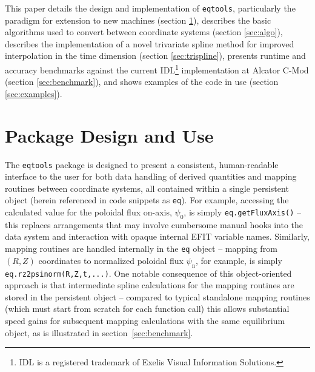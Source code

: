 \documentclass{elsarticle}
\newcommand{\eqtools}{\texttt{eqtools}\xspace}
\begin{document}
This paper details the design and implementation of \eqtools, particularly the paradigm for extension to new machines (section \ref{sec:design}), describes the basic algorithms used to convert between coordinate systems (section \ref{sec:algo}), describes the implementation of a novel trivariate spline method for improved interpolation in the time dimension (section \ref{sec:trispline}), presents runtime and accuracy benchmarks against the current IDL\footnote{IDL is a registered trademark of Exelis Visual Information Solutions.} implementation at Alcator C-Mod (section \ref{sec:benchmark}), and shows examples of the code in use (section \ref{sec:examples}).

\section{Package Design and Use}\label{sec:design}

The \eqtools package is designed to present a consistent, human-readable interface to the user for both data handling of derived quantities and mapping routines between coordinate systems, all contained within a single persistent object (herein referenced in code snippets as \verb|eq|).
For example, accessing the calculated value for the poloidal flux on-axis, $\psi_0$, is simply \verb|eq.getFluxAxis()| -- this replaces arrangements that may involve cumbersome manual hooks into the data system and interaction with opaque internal EFIT variable names.
Similarly, mapping routines are handled internally in the \verb|eq| object -- mapping from $(R, Z)$ coordinates to normalized poloidal flux $\psi_{\text{n}}$, for example, is simply \verb|eq.rz2psinorm(R,Z,t,...)|.  
One notable consequence of this object-oriented approach is that intermediate spline calculations for the mapping routines are stored in the persistent object -- compared to typical standalone mapping routines (which must start from scratch for each function call) this allows substantial speed gains for subsequent mapping calculations with the same equilibrium object, as is illustrated in section~\ref{sec:benchmark}.
\end{document}
